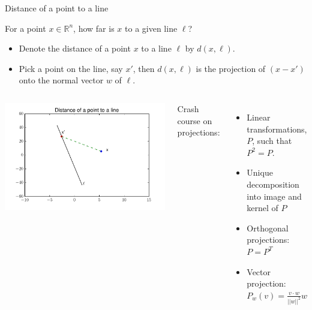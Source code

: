 \documentclass{beamer}
\begin{document}
\begin{frame}{Distance of a point to a line}

For a point $x \in \mathbb{R}^n$, how far is $x$ to a given line $\ell$?
\begin{itemize}
    \item Denote the distance of a point $x$ to a line $\ell$ by $d(x,\ell)$.
    \item Pick a point on the line, say $x'$, then $d(x,\ell)$ is the projection of $(x-x')$ onto the normal vector $w$ of $\ell$.
\end{itemize}

\begin{columns}
\includegraphics[scale=0.4225]{figures/proj.pdf}

Crash course on projections:
\begin{itemize}
    \item Linear transformations, $P$, such that $P^2=P$.
    \item Unique decomposition into image and kernel of $P$
    \item Orthogonal projections: $P=P^T$
    \item Vector projection: $P_w(v)=\frac{v\cdot w}{||w||^2}w$
\end{itemize}
\end{columns}
    
\end{frame}

\end{document}
